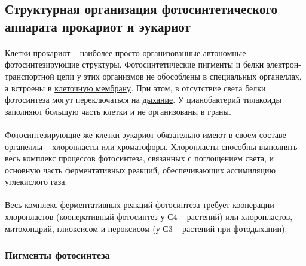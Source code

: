 \subsection*{Структурная организация фотосинтетического аппарата прокариот и эукариот}

\paragraph*{}Клетки прокариот -- наиболее просто организованные автономные фотосинтезирующие структуры. Фотосинтетические пигменты и белки электрон-транспортной цепи у этих организмов не обособлены в специальных органеллах, а встроены в \hyperlink{plasmolema}{клеточную мембрану}. При этом, в отсутствие света белки фотосинтеза могут переключаться на \hyperlink{sect_breazing}{дыхание}. У цианобактерий тилакоиды заполняют большую часть клетки и не организованы в граны. 

\paragraph*{}Фотосинтезирующие же клетки эукариот обязательно имеют в своем составе органеллы -- \hyperlink{cell_plastids}{хлоропласты} или хроматофоры. Хлоропласты способны выполнять весь комплекс процессов фотосинтеза, связанных с поглощением света, и основную часть ферментативных реакций, обеспечивающих ассимиляцию углекислого газа. 

\paragraph*{}Весь комплекс ферментативных реакций фотосинтеза требует кооперации хлоропластов (кооперативный фотосинтез у С4 – растений) или хлоропластов, \hyperlink{mitohondria}{митохондрий}, глиоксисом и пероксисом (у С3 – растений при фотодыхании).


\subsubsection*{Пигменты фотосинтеза}

